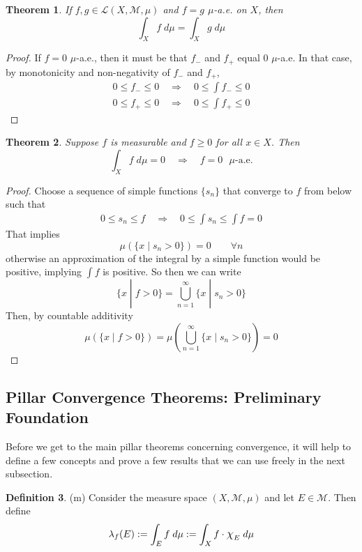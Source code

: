 \documentclass[12pt]{article}
\theoremstyle{plain}
\newtheorem{thm}{Theorem}[subsection]
\theoremstyle{definition}
\newtheorem{defn}[thm]{Definition}
\theoremstyle{remark}
\newcommand*{\Chi}{\mbox{\large$\chi$}} %
\begin{document}
\begin{thm}
If $f,g\in\mathscr{L}(X,\mathscr{M},\mu)$ and $f=g$ $\mu$-a.e. on $X$, then 
\[
    \int_X f \; d\mu = \int_X g \; d\mu
\]
\end{thm}
\begin{proof}
If $f=0$ $\mu$-a.e., then it must be that $f_-$ and $f_+$ equal 0 $\mu$-a.e. In that case, by monotonicity and non-negativity of $f_-$ and $f_+$, 
\begin{align*}
    0 \leq f_- \leq 0  
    \quad \Rightarrow \quad
    0 \leq \int f_- \leq 0  \\
    0 \leq f_+ \leq 0  
    \quad \Rightarrow \quad
    0 \leq \int f_+ \leq 0  
\end{align*}
\end{proof}


\begin{thm}
Suppose $f$ is measurable and $f\geq 0$ for all $x\in X$. Then 
\[
    \int_X f \; d\mu = 0 \quad \Rightarrow\quad
    f = 0 \text{ $\mu$-a.e.}
\]
\end{thm}
\begin{proof}
Choose a sequence of simple functions $\{s_n\}$ that converge to $f$ from below such that 
\begin{align*}
    0 \leq s_n \leq f 
    \quad\Rightarrow\quad
    0 \leq \int s_n \leq \int f = 0
\end{align*}
That implies 
\[
    \mu\left(\{x \; | \; s_n > 0 \}\right) = 0
    \qquad \forall n
\]
otherwise an approximation of the integral by a simple function would be positive, implying $\int f$ is positive. So then we can write
\[
    \{x \; | \; f>0 \} =    
    \bigcup^\infty_{n=1} \{x \; | \; s_n>0 \} 
\]
Then, by countable additivity
\[
    \mu\left(\{x \; | \; f>0 \} \right)=    
    \mu\left(\bigcup^\infty_{n=1} \{x \; | \; s_n>0 \} 
    \right) = 0
\]



\end{proof}



\newpage
\subsection{Pillar Convergence Theorems: Preliminary Foundation}

Before we get to the main pillar theorems concerning convergence, it will help to define a few concepts and prove a few results that we can use freely in the next subsection.

\begin{defn} (m)
Consider the measure space $(X,\mathscr{M},\mu)$ and let $E\in\mathscr{M}$. Then define
\[
    \lambda_f(E) := \int_E f \; d\mu 
    := \int_X f\cdot\Chi_E \;d\mu
\]
\end{defn}
\end{document}

